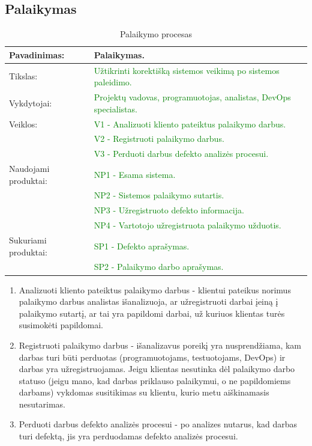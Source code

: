 \documentclass{VUMIFPSkursinis}
\begin{document}
	\subsection{Palaikymas}
	\begin{center}
		\begin{table}[ht]
			\caption{Palaikymo procesas}
			\begin{tabular}{ | l | l | }
				\hline
				Pavadinimas:		& Palaikymas.								\\ \hline
				Tikslas:		& \textcolor{green}{Užtikrinti korektišką sistemos veikimą po sistemos paleidimo.}		\\ \hline
				Vykdytojai:		& \textcolor{green}{Projektų vadovas, programuotojas, analistas, DevOps specialistas.}	\\ \hline
				Veiklos:		& \textcolor{green}{V1 - Analizuoti kliento pateiktus palaikymo darbus.	}		\\
							& \textcolor{green}{V2 - Registruoti palaikymo darbus. 	}				\\
							& \textcolor{green}{V3 - Perduoti darbus defekto analizės procesui.}			\\ \hline

				Naudojami produktai:	&\textcolor{green}{NP1 - Esama sistema.	}						\\
							&\textcolor{green}{ NP2 - Sistemos palaikymo sutartis.	}				\\
							&\textcolor{green}{ NP3 - Užregistruoto defekto informacija.	}			\\
							& \textcolor{green}{NP4 - Vartotojo užregistruota palaikymo užduotis.	}		\\ \hline
				Sukuriami produktai:	& \textcolor{green}{SP1 - Defekto aprašymas.	}					\\
							&\textcolor{green}{ SP2 - Palaikymo darbo aprašymas.	}				\\ \hline
			\end{tabular}
		\end{table}
	\end{center}

	\begin{enumerate}
		\item{
			Analizuoti kliento pateiktus palaikymo darbus - klientui pateikus norimus palaikymo darbus analistas išanalizuoja, ar užregistruoti darbai įeiną į palaikymo sutartį, ar tai yra papildomi darbai, už kuriuos klientas turės susimokėti papildomai.
		}
		\item{
			Registruoti palaikymo darbus - išanalizavus poreikį yra nusprendžiama, kam darbas turi būti perduotas (programuotojams, testuotojams, DevOps) ir darbas yra užregistruojamas.
			Jeigu klientas nesutinka dėl palaikymo darbo statuso (jeigu mano, kad darbas priklauso palaikymui, o ne papildomiems darbams) vykdomas susitikimas su klientu, kurio metu aiškinamasis nesutarimas.
		}
		\item{
			Perduoti darbus defekto analizės procesui - po analizes nutarus, kad darbas turi defektą, jis yra perduodamas defekto analizės procesui.
		}
	\end{enumerate}
\end{document}
